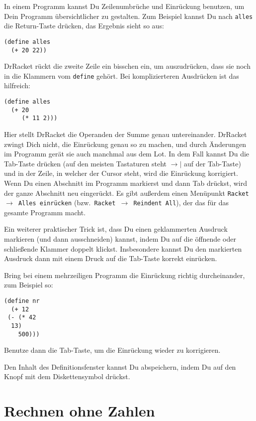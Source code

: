 In einem Programm kannst Du Zeilenumbrüche und Einrückung benutzen, um
Dein Programm übersichtlicher zu gestalten.  Zum Beispiel kannst Du
nach \lstinline{alles} die Return-Taste drücken, das Ergebnis sieht so
aus:
%
\begin{lstlisting}
(define alles
  (+ 20 22))
\end{lstlisting}
%
DrRacket rückt die zweite Zeile ein bisschen ein, um auszudrücken,
dass sie noch in die Klammern vom \lstinline{define} gehört.  Bei
komplizierteren Ausdrücken ist das hilfreich:
%
\begin{lstlisting}
(define alles
  (+ 20
     (* 11 2)))
\end{lstlisting}
%
Hier stellt DrRacket die Operanden der Summe genau untereinander.
DrRacket zwingt Dich nicht, die Einrückung genau so zu machen, und
durch Änderungen im Programm gerät sie auch manchmal aus dem Lot.  In
dem Fall kannst Du die Tab-Taste drücken (auf den meisten Tastaturen
steht $\longrightarrow\mid$ auf der Tab-Taste) und in der Zeile, in
welcher der Cursor steht, wird die Einrückung korrigiert.
Wenn Du einen Abschnitt im Programm markierst und dann Tab drückst,
wird der ganze Abschnitt neu eingerückt.  
Es gibt
außerdem einen Menüpunkt \texttt{Racket $\rightarrow$ Alles einrücken} (bzw.\
\texttt{Racket $\rightarrow$ Reindent All}), der das für das gesamte
Programm macht.

Ein weiterer praktischer Trick ist, dass Du einen geklammerten
Ausdruck markieren (und dann ausschneiden) kannst, indem Du auf die
öffnende oder schließende Klammer doppelt klickst.  Insbesondere
kannst Du den markierten Ausdruck dann mit einem Druck auf die
Tab-Taste korrekt einrücken.

\begin{aufgabeinline}
  Bring bei einem mehrzeiligen Programm die Einrückung richtig
  durcheinander, zum Beispiel so:
\begin{lstlisting}
(define nr
  (+ 12
 (- (* 42
  13)
    500)))
\end{lstlisting}
  Benutze dann die Tab-Taste, um die Einrückung wieder zu korrigieren.
\end{aufgabeinline}
%
Den Inhalt des Definitionsfenster kannst Du abspeichern, indem Du auf
den Knopf mit dem Diskettensymbol
 drückst.

\section{Rechnen ohne Zahlen}

